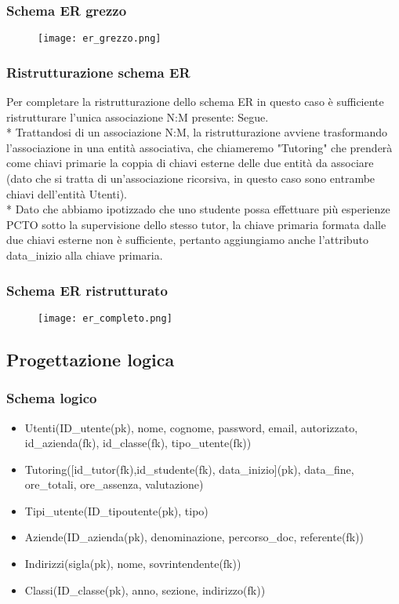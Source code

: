 \documentclass[12pt]{article}
\begin{document}
\newpage
\subsubsection{Schema ER grezzo}
\begin{figure}[h]
    \begin{center}
    \texttt{[image: er\_grezzo.png]}
    \end{center}
\end{figure}

\newpage
\subsubsection{Ristrutturazione schema ER}
Per completare la ristrutturazione dello schema ER in questo caso è sufficiente ristrutturare l'unica associazione N:M presente: Segue.\\*
Trattandosi di un associazione N:M, la ristrutturazione avviene trasformando l'associazione in una entità associativa, che chiameremo "Tutoring" che prenderà come chiavi primarie la coppia di chiavi esterne delle due entità da associare (dato che si tratta di un'associazione ricorsiva, in questo caso sono entrambe chiavi dell'entità Utenti).\\*
Dato che abbiamo ipotizzado che uno studente possa effettuare più esperienze PCTO sotto la supervisione dello stesso tutor, la chiave primaria formata dalle due chiavi esterne non è sufficiente, pertanto aggiungiamo anche l'attributo data\_inizio alla chiave primaria.
\subsubsection{Schema ER ristrutturato}
\begin{figure}[h]
    \begin{center}
    \texttt{[image: er\_completo.png]}
    \end{center}
\end{figure}

\newpage
\subsection{Progettazione logica}
\subsubsection{Schema logico}
\begin{itemize}
    \item Utenti(ID\_utente(pk), nome, cognome, password, email, autorizzato, id\_azienda(fk), id\_classe(fk), tipo\_utente(fk))
    \item Tutoring([id\_tutor(fk),id\_studente(fk), data\_inizio](pk), data\_fine, ore\_totali, ore\_assenza, valutazione)
    \item Tipi\_utente(ID\_tipoutente(pk), tipo)
    \item Aziende(ID\_azienda(pk), denominazione, percorso\_doc, referente(fk))
    \item Indirizzi(sigla(pk), nome, sovrintendente(fk))
    \item Classi(ID\_classe(pk), anno, sezione, indirizzo(fk))
    
\end{itemize}
\end{document}
